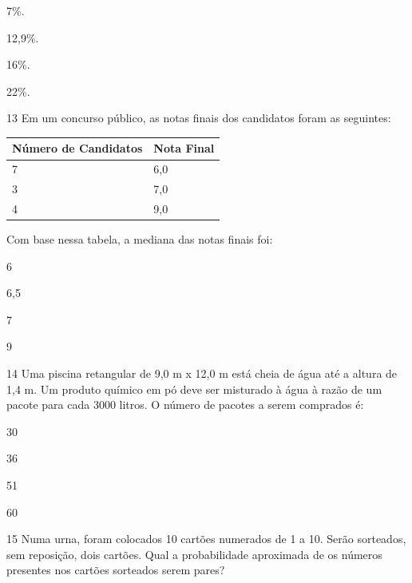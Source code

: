 \begin{escolha}

  \item 7\%.

  \item 12,9\%.

  \item 16\%.

  \item 22\%.

\end{escolha}


\num{13} Em um concurso público, as notas finais dos candidatos foram
as seguintes:

\begin{longtable}[]{@{}ll@{}}
\toprule
Número de Candidatos & Nota Final\tabularnewline
\midrule
\endhead
7 & 6,0\tabularnewline
3 & 7,0\tabularnewline
4 & 9,0\tabularnewline
\bottomrule
\end{longtable}

Com base nessa tabela, a mediana das notas finais foi:

\begin{escolha}

  \item 6

  \item 6,5

  \item 7

  \item 9

\end{escolha}

\num{14} Uma piscina retangular de 9,0 m x 12,0 m está cheia de água até 
a altura de 1,4 m. Um produto químico em pó deve ser misturado à água à razão
de um pacote para cada 3000 litros. O número de pacotes a serem comprados é:

\begin{escolha}

  \item 30

  \item 36

  \item 51

  \item 60

\end{escolha}

\num{15} Numa urna, foram colocados 10 cartões numerados de 1 a 10. Serão
sorteados, sem reposição, dois cartões. Qual a probabilidade
aproximada de os números presentes nos cartões sorteados serem pares?

